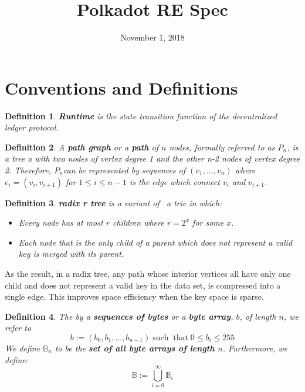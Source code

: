 \documentclass{article}
\newcommand{\assign}{:=}
\newcommand{\tmop}[1]{\ensuremath{\operatorname{#1}}}
\newcommand{\tmstrong}[1]{\textbf{#1}}
\newtheorem{definition}{Definition}
\begin{document}
\title{Polkadot RE Spec}

\date{November 1, 2018}

\maketitle

\section{Conventions and Definitions}

\begin{definition}
  {\tmstrong{Runtime}} is the state transition function of the decentralized
  ledger protocol.
\end{definition}

\begin{definition}
  \label{def-path-graph}A {\tmstrong{path graph}} or a {\tmstrong{path}} of
  $n$ nodes, formally referred to as {\tmstrong{$P_n$}}, is a tree a with two
  nodes of vertex degree 1 and the other n-2 nodes of vertex degree 2.
  Therefore, $P_n$can be represented by sequences of $(v_1, \ldots, v_n)$
  where $e_i = (v_i, v_{i + 1})$ for $1 \leqslant i \leqslant n - 1$ is the
  edge which connect $v_i$ and $v_{i + 1}$.
\end{definition}

\begin{definition}
  \label{def-radix-tree}{\tmstrong{radix r tree}} is a variant of \ a trie in
  which:
  \begin{itemize}
    \item Every node has at most $r$ children where $r = 2^x$ for some $x$.
    
    \item Each node that is the only child of a parent which does not
    represent a valid key is merged with its parent.
  \end{itemize}
\end{definition}

As the result, in a radix tree, any path whose interior vertices all have only
one child and does not represent a valid key in the data set, is compressed
into a single edge. This improves space efficiency when the key space is
sparse.

\begin{definition}
  The by a {\tmstrong{sequences of bytes}} or a {\tmstrong{byte array}}, $b$,
  of length $n$, we refer to
  \[ b \assign (b_0, b_1, ..., b_{n - 1}) \tmop{such} \tmop{that} 0 \leqslant
     b_i \leqslant 255 \]
  We define $\mathbb{B}_n$ to be the {\tmstrong{set of all byte arrays of
  length $n$}}. Furthermore, we define:
  \[ \mathbb{B} \assign \bigcup^{\infty}_{i = 0} \mathbb{B}_i \]
\end{definition}
\end{document}
